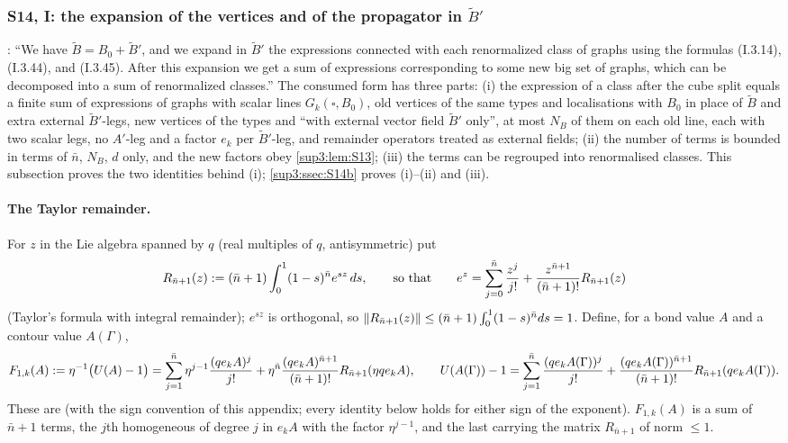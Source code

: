 
\subsubsection{S14, I: the expansion of the vertices and of the propagator in $\tilde B'$}\label{sup3:ssec:S14a}

\cite[p.~433]{Ba3}: ``We have $\tilde B=B_0+\tilde B'$, and we expand in $\tilde B'$ the expressions connected with each renormalized class of graphs using the formulas (I.3.14), (I.3.44), and (I.3.45). After this expansion we get a sum of expressions corresponding to some new big set of graphs, which can be decomposed into a sum of renormalized classes.'' The consumed form has three parts: (i) the expression of a class after the cube split equals a finite sum of expressions of graphs with scalar lines $G_k(\square,B_0)$, old vertices of the same types and localisations with $B_0$ in place of $\tilde B$ and extra external $\tilde B'$-legs, new vertices of the types \cite[(1.8)--(1.11)]{Ba3} and \cite[(1.13)--(1.15)]{Ba3} ``with external vector field $\tilde B'$ only'', at most $N_B$ of them on each old line, each with two scalar legs, no $A'$-leg and a factor $e_k$ per $\tilde B'$-leg, and remainder operators treated as external fields; (ii) the number of terms is bounded in terms of $\bar n$, $N_B$, $d$ only, and the new factors obey \cref{sup3:lem:S13}; (iii) the terms can be regrouped into renormalised classes. This subsection proves the two identities behind (i); \cref{sup3:ssec:S14b} proves (i)--(ii) and (iii).

\paragraph{The Taylor remainder.} For $z$ in the Lie algebra spanned by $q$ (real multiples of $q$, antisymmetric) put
\[
R_{\bar n+1}(z):=(\bar n+1)\int_0^1(1-s)^{\bar n}e^{sz}\,ds,\qquad\text{so that}\qquad e^z=\sum_{j=0}^{\bar n}\frac{z^j}{j!}+\frac{z^{\bar n+1}}{(\bar n+1)!}R_{\bar n+1}(z)
\]
(Taylor's formula with integral remainder); $e^{sz}$ is orthogonal, so $\lVert R_{\bar n+1}(z)\rVert\le(\bar n+1)\int_0^1(1-s)^{\bar n}ds=1$. Define, for a bond value $A$ and a contour value $A(\Gamma)$,
\[
F_{1,k}(A):=\eta^{-1}\big(U(A)-1\big)=\sum_{j=1}^{\bar n}\eta^{j-1}\frac{(qe_kA)^j}{j!}+\eta^{\bar n}\frac{(qe_kA)^{\bar n+1}}{(\bar n+1)!}R_{\bar n+1}(\eta qe_kA),\qquad
U(A(\Gamma))-1=\sum_{j=1}^{\bar n}\frac{(qe_kA(\Gamma))^j}{j!}+\frac{(qe_kA(\Gamma))^{\bar n+1}}{(\bar n+1)!}R_{\bar n+1}(qe_kA(\Gamma)).
\]
These are \cite[(3.14)--(3.15)]{Ba1} (with the sign convention of this appendix; every identity below holds for either sign of the exponent). $F_{1,k}(A)$ is a sum of $\bar n+1$ terms, the $j$th homogeneous of degree $j$ in $e_kA$ with the factor $\eta^{j-1}$, and the last carrying the matrix $R_{\bar n+1}$ of norm $\le1$.

